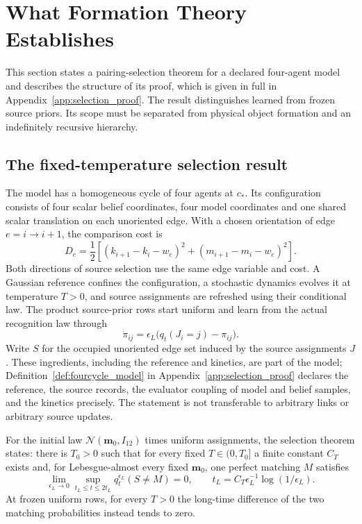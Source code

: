 \section{What Formation Theory Establishes}\label{sec:participatory}

This section states a pairing-selection theorem for a declared four-agent model and describes the structure of its proof, which is given in full in Appendix~\ref{app:selection_proof}. The result distinguishes learned from frozen source priors. Its scope must be separated from physical object formation and an indefinitely recursive hierarchy.

\subsection{The fixed-temperature selection result}
The model has a homogeneous cycle of four agents at $c_*$. Its configuration consists of four scalar belief coordinates, four model coordinates and one shared scalar translation on each unoriented edge. With a chosen orientation of edge $e=i\to i+1$, the comparison cost is
\begin{equation}
D_e=\frac12\left[(k_{i+1}-k_i-w_e)^2+(m_{i+1}-m_i-w_e)^2\right].
\label{eq:formation_cycle_cost}
\end{equation}
Both directions of source selection use the same edge variable and cost. A Gaussian reference confines the configuration, a stochastic dynamics evolves it at temperature $T>0$, and source assignments are refreshed using their conditional law. The product source-prior rows start uniform and learn from the actual recognition law through
\begin{equation}
\dot\pi_{ij}=\epsilon_L\bigl(q_t(J_i=j)-\pi_{ij}\bigr).
\label{eq:formation_source_learning}
\end{equation}
Write $S$ for the occupied unoriented edge set induced by the source assignments $J$. These ingredients, including the reference and kinetics, are part of the model; Definition~\ref{def:fourcycle_model} in Appendix~\ref{app:selection_proof} declares the reference, the source records, the evaluator coupling of model and belief samples, and the kinetics precisely. The statement is not transferable to arbitrary links or arbitrary source updates.

For the initial law $\mathcal N(\mathbf m_0,I_{12})$ times uniform assignments, the selection theorem states: there is $T_0>0$ such that for every fixed $T\in(0,T_0]$ a finite constant $C_T$ exists and, for Lebesgue-almost every fixed $\mathbf m_0$, one perfect matching $M$ satisfies
\begin{equation}
\lim_{\epsilon_L\to0}
\sup_{t_L\leq t\leq2t_L}q_t^{\epsilon_L}(S\ne M)=0,
\qquad
t_L=C_T\epsilon_L^{-1}\log(1/\epsilon_L).
\label{eq:formation_selection_window}
\end{equation}
At frozen uniform rows, for every $T>0$ the long-time difference of the two matching probabilities instead tends to zero.

